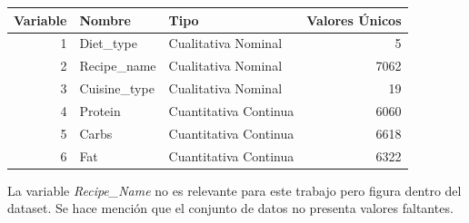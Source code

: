 \documentclass[12pt,a4paper]{article}
\begin{document}
{{            \begin{center}
                \begin{tabular}{r|llr}
                    \toprule
                    Variable & Nombre & Tipo & Valores Únicos\\
                    \midrule
                    1 & Diet\_type    & Cualitativa Nominal   &    5 \\
                    2 & Recipe\_name  & Cualitativa Nominal   & 7062 \\
                    3 & Cuisine\_type & Cualitativa Nominal   &   19 \\
                    4 & Protein       & Cuantitativa Continua & 6060 \\
                    5 & Carbs         & Cuantitativa Continua & 6618 \\
                    6 & Fat           & Cuantitativa Continua & 6322 \\
                    \bottomrule
                \end{tabular}
            \end{center}
            
            La variable \emph{Recipe\_Name} no es relevante para este trabajo pero figura 
            dentro del dataset. Se hace mención que el conjunto de datos no presenta 
            valores faltantes.
        }
    }

    \newpage
\end{document}
